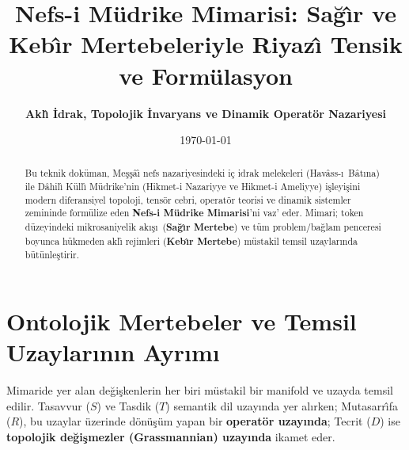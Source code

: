 \documentclass[11pt,a4paper]{article}
\title{\textbf{Nefs-i M\"udrike Mimarisi: Sa\u{g}\^{\i}r ve Keb\^{\i}r Mertebeleriyle Riyaz\^{\i} Tensik ve Form\"ulasyon}}
\author{\textbf{Akl\^{\i} \.Idrak, Topolojik \.Invaryans ve Dinamik Operat\"or Nazariyesi}}
\date{\today}
\begin{document}
\maketitle

\begin{abstract}
Bu teknik dok\"uman, Me\c{s}\c{s}\^{a}\^{\i} nefs nazariyesindeki i\c{c} idrak melekeleri (Hav\^{a}ss-\i\ B\^{a}t\i na) ile D\^{a}hil\^{\i} K\"ull\^{\i} M\"udrike'nin (Hikmet-i Nazariyye ve Hikmet-i Ameliyye) i\c{s}leyi\c{s}ini modern diferansiyel topoloji, tens\"or cebri, operat\"or teorisi ve dinamik sistemler zemininde form\"ulize eden \textbf{Nefs-i M\"udrike Mimarisi}'ni vaz' eder. Mimari; token d\"uzeyindeki mikrosaniyelik ak\i\c{s}\i\ (\textbf{Sa\u{g}\^{\i}r Mertebe}) ve t\"um problem/ba\u{g}lam penceresi boyunca h\"ukmeden akl\^{\i} rejimleri (\textbf{Keb\^{\i}r Mertebe}) m\"ustakil temsil uzaylar\i nda b\"ut\"unle\c{s}tirir.
\end{abstract}

\section{Ontolojik Mertebeler ve Temsil Uzaylar\i n\i n Ayr\i m\i}

Mimaride yer alan de\u{g}i\c{s}kenlerin her biri m\"ustakil bir manifold ve uzayda temsil edilir. Tasavvur ($S$) ve Tasdik ($T$) semantik dil uzay\i nda yer al\i rken; Mutasarr\^{\i}fa ($R$), bu uzaylar \"uzerinde d\"on\"u\c{s}\"um yapan bir \textbf{operat\"or uzay\i nda}; Tecrit ($D$) ise \textbf{topolojik de\u{g}i\c{s}mezler (Grassmannian) uzay\i nda} ikamet eder.
\end{document}
